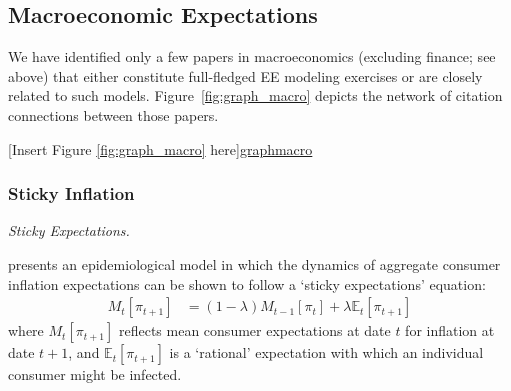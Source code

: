 \subsection{Macroeconomic Expectations}\label{subsec:macroExp}

We have identified only a few papers in macroeconomics (excluding finance; see above) that either constitute full-fledged EE modeling exercises or are closely related to such models. Figure~\ref{fig:graph_macro} depicts the network of citation connections between those papers.

\begin{center}
	[Insert Figure \ref{fig:graph_macro}  here]\hyperlink{graphmacro}{graphmacro}
\end{center}

\subsubsection{Sticky Inflation}


\textit{Sticky Expectations.}

\cite{carroll2003macroeconomic} presents an epidemiological model in which the dynamics of aggregate consumer inflation expectations can be shown to follow a `sticky expectations' equation:
    \begin{align}
        M_{t}[\pi_{t+1}] & = (1-\lambda)M_{t-1}[\pi_{t}]+\lambda \mathbb{E}_{t}[\pi_{t+1}] \label{eq:StickyExp}
    \end{align}
where $M_{t}[\pi_{t+1}]$ reflects mean consumer expectations at date $t$ for inflation at date $t+1$, and $\mathbb{E}_{t}[\pi_{t+1}]$ is a `rational' expectation with which an individual consumer might be infected.


